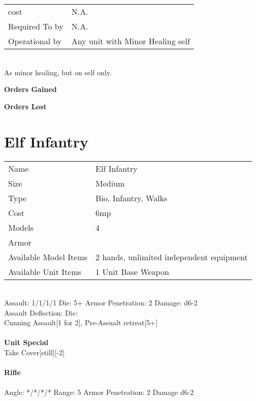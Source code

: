 \begin{tabular}{ll}
  cost & N.A.\\
  Required To by & N.A.\\
  Operational by & Any unit with Minor Healing self\\

\end{tabular}
\ \\
As minor healing, but on self only.

{\bf Orders Gained    }

\noindent 

{\bf Orders Lost }

\noindent 
\pagebreak

\section{ Elf Infantry }

\begin{tabular}{ll}
  Name & Elf Infantry \\
  Size & Medium\\
  Type & Bio, Infantry, Walks\\
  Cost & 6mp\\
  Models & 4\\
  Armor & \\
  Available Model Items & 2 hands, unlimited independent equipment \\
  Available Unit Items & 1 Unit Base Weapon \\
\end{tabular}

\ \\
Assault: 1/1/1/1 Die: 5+ Armor Penetration: 2 Damage: d6-2 \\
Assault Deflection:  Die: \\
\indent Cunning Assault[1 for 2], Pre-Assualt retreat[5+] \\
\ \\

{\bf Unit Special} \\
Take Cover[still][-2]
\ \\
\ \\
{\bf Rifle } \\
\ \\
Angle: */*/*/* Range: 5 Armor Penetration: 2 Damage d6-2 \\
\indent  \\






